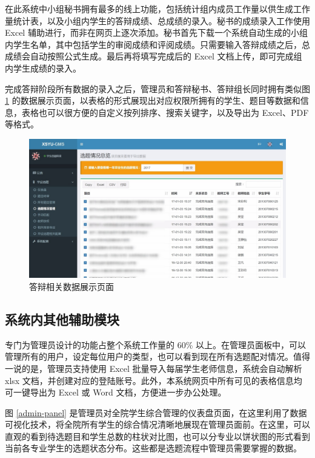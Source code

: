 在此系统中小组秘书拥有最多的线上功能，包括统计组内成员工作量以供生成工作量统计表，以及小组内学生的答辩成绩、总成绩的录入。秘书的成绩录入工作使用 Excel 辅助进行，而非在网页上逐次添加。秘书首先下载一个系统自动生成的小组内学生名单，其中包括学生的审阅成绩和评阅成绩。只需要输入答辩成绩之后，总成绩会自动按照公式生成。最后再将填写完成后的 Excel 文档上传，即可完成组内学生成绩的录入。

完成答辩阶段所有数据的录入之后，管理员和答辩秘书、答辩组长同时拥有类似图 \ref{data-show} 的数据展示页面，以表格的形式展现出对应权限所拥有的学生、题目等数据和信息，表格也可以很方便的自定义按列排序、搜索关键字，以及导出为 Excel、PDF 等格式。

\begin{figure}
	\centering
	\includegraphics[width=\linewidth]{figure/5-3}
	\caption{答辩相关数据展示页面}
	\label{data-show}
\end{figure}


\subsection{系统内其他辅助模块}

专门为管理员设计的功能占整个系统工作量的 60\% 以上。在管理员面板中，可以管理所有的用户，设定每位用户的类型，也可以看到现在所有选题配对情况。值得一说的是，管理员支持使用 Excel 批量导入每届学生老师信息，系统会自动解析 xlsx 文档，并创建对应的登陆账号。此外，本系统网页中所有可见的表格信息均可一键导出为 Excel 或 Word 文档，方便进一步办公处理。

图 \ref{admin-panel} 是管理员对全院学生综合管理的仪表盘页面，在这里利用了数据可视化技术，将全院所有学生的综合情况清晰地展现在管理员面前。在这里，可以直观的看到待选题目和学生总数的柱状对比图，也可以分专业以饼状图的形式看到当前各专业学生的选题状态分布。这些都是选题流程中管理员需要掌握的数据。

